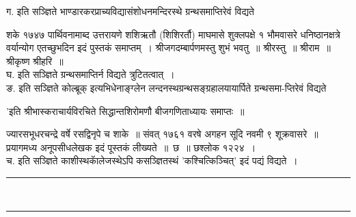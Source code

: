 \documentclass[11pt, openany]{book}
\begin{document}
\begin{sloppypar}
ग. इति सञ्ज्ञिते भाण्डारकरप्राच्यविद्यासंशोधनमन्दिरस्थे ग्रन्थसमाप्तिरेवं विद्यते\textendash 
\vspace{2mm}

शके १७४७ पार्थिवनामाब्द उत्तरायणे शशिऋतौ (शिशिरर्तौ) माघमासे शुक्लपक्षे १ भौमवासरे धनिष्ठानक्षत्रे वर्यान्योग एतच्छुभदिन इदं पुस्तकं समाप्तम्~। श्रीजगदम्बार्पणमस्तु शुभं भवतु~॥ श्रीरस्तु~॥ श्रीराम~॥ श्रीकृष्ण श्रीहरि~॥ \\

घ. इति सञ्ज्ञिते ग्रन्थसमाप्तिर्न विद्यते त्रुटितत्वात्~। \\

ङ. इति सञ्ज्ञिते कोल्ब्रूक् इत्यभिधेनाङ्ग्लेन लन्दनस्थग्रन्थसङ्ग्रहालयायार्पिते ग्रन्थसमा-प्तिरेवं विद्यते\textendash 
\vspace{2mm}

'इति श्रीभास्कराचार्यविरचिते सिद्धान्तशिरोमणौ बीजगणिताध्यायः समाप्तः~॥
\vspace{2mm}

ज्यारसभूधरचन्द्रे वर्षे रसद्विनृपे च शाके~॥ संवत् १७६१ वरषे अगहन सूदि नवमी ९ शूक्रवासरे~॥ प्रयागमध्य अनूपसीधलेखक इदं पूस्तकं लीख्यते~॥~छ~॥ छश्लोक १२२४~। \\

च. इति सञ्ज्ञिते काशीस्थकाॅलेजस्थेऽपि कसञ्ज्ञितस्थं 'कश्चित्किञ्चित्' इदं पद्यं विद्यते~। 

\begin{center}
\rule{0.2\linewidth}{0.8pt}\\
\vspace{-4mm}

\rule{0.2\linewidth}{0.8pt}
\end{center}

\end{sloppypar}
\end{document}
